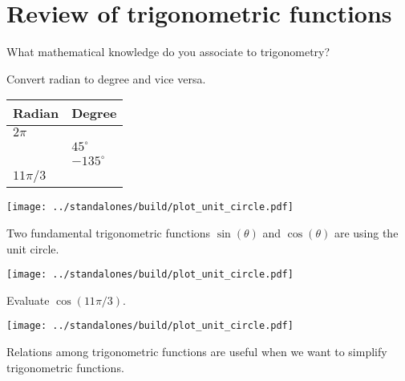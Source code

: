\documentclass[../main.tex]{subfiles}
\begin{document}
 \section{Review of trigonometric functions}
  \faComments{} What mathematical knowledge do you associate to trigonometry?

  \begin{example}
    Convert radian to degree and vice versa. 

    \begin{minipage}{.4\textwidth}
      \begin{tabular}{p{1in} | p{1in}}
        Radian & Degree \\\midrule
        \(2\pi\) & \\[2ex] \midrule
                 & \(45^{\circ}\) \\[2ex] \midrule
                 & \(-135^{\circ}\) \\[2ex] \midrule
        \(11\pi/3\) & \\[2ex] \midrule
      \end{tabular}
    \end{minipage}
    \begin{minipage}{.59\textwidth}
      \texttt{[image: ../standalones/build/plot\_unit\_circle.pdf]}
    \end{minipage}
  \end{example}

  Two fundamental trigonometric functions \(\sin(\theta)\) and \(\cos(\theta)\) are  using the unit circle.

  \begin{minipage}{2.5in}
    \texttt{[image: ../standalones/build/plot\_unit\_circle.pdf]}
  \end{minipage}
  \begin{minipage}{4.5in}
  \end{minipage}

  \begin{example}
    Evaluate \(\cos(11\pi/3)\).

    \begin{minipage}{2.5in}
      \texttt{[image: ../standalones/build/plot\_unit\_circle.pdf]}
    \end{minipage}
    \begin{minipage}{4.5in}
    \end{minipage}
  \end{example}
  \clearpage

  Relations among trigonometric functions are useful when we want to simplify trigonometric functions. 
\end{document}
